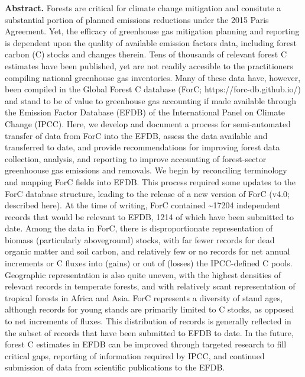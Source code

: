\documentclass[, manuscript]{copernicus}
\begin{document}
\textbf{Abstract.} Forests are critical for climate change mitigation
and consitute a substantial portion of planned emissions reductions
under the 2015 Paris Agreement. Yet, the efficacy of greenhouse gas
mitigation planning and reporting is dependent upon the quality of
available emission factors data, including forest carbon (C) stocks and
changes therein. Tens of thousands of relevant forest C estimates have
been published, yet are not readily accesible to the practitioners
compiling national greenhouse gas inventories. Many of these data have,
however, been compiled in the Global Forest C database (ForC;
https://forc-db.github.io/) and stand to be of value to greenhouse gas
accounting if made available through the Emission Factor Database (EFDB)
of the International Panel on Climate Change (IPCC). Here, we develop
and document a process for semi-automated transfer of data from ForC
into the EFDB, assess the data available and transferred to date, and
provide recommendations for improving forest data collection, analysis,
and reporting to improve accounting of forest-sector greenhoouse gas
emissions and removals. We begin by reconciling terminology and mapping
ForC fields into EFDB. This process required some updates to the ForC
database structure, leading to the release of a new version of ForC
(v4.0; described here). At the time of writing, ForC contained
\textasciitilde17204 independent records that would be relevant to EFDB,
1214 of which have been submitted to date. Among the data in ForC, there
is disproportionate representation of biomass (particularly aboveground)
stocks, with far fewer records for dead organic matter and soil carbon,
and relatively few or no records for net annual increments or C fluxes
into (gains) or out of (losses) the IPCC-defined C pools. Geographic
representation is also quite uneven, with the highest densities of
relevant records in temperate forests, and with relatively scant
representation of tropical forests in Africa and Asia. ForC represents a
diversity of stand ages, although records for young stands are primarily
limited to C stocks, as opposed to net increments of fluxes. This
distribution of records is generally reflected in the subset of records
that have been submitted to EFDB to date. In the future, forest C
estimates in EFDB can be improved through targeted research to fill
critical gaps, reporting of information required by IPCC, and continued
submission of data from scientific publications to the EFDB.

\introduction[Introduction]
\end{document}
